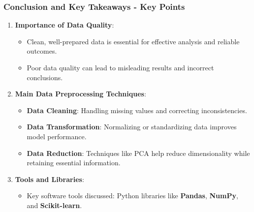 \documentclass{beamer}
\begin{document}
\begin{frame}[fragile]
    \frametitle{Conclusion and Key Takeaways - Key Points}
    \begin{enumerate}
        \item \textbf{Importance of Data Quality}:
            \begin{itemize}
                \item Clean, well-prepared data is essential for effective analysis and reliable outcomes.
                \item Poor data quality can lead to misleading results and incorrect conclusions.
            \end{itemize}
        
        \item \textbf{Main Data Preprocessing Techniques}:
            \begin{itemize}
                \item \textbf{Data Cleaning}: Handling missing values and correcting inconsistencies.
                \item \textbf{Data Transformation}: Normalizing or standardizing data improves model performance.
                \item \textbf{Data Reduction}: Techniques like PCA help reduce dimensionality while retaining essential information.
            \end{itemize}

        \item \textbf{Tools and Libraries}:
            \begin{itemize}
                \item Key software tools discussed: Python libraries like \textbf{Pandas}, \textbf{NumPy}, and \textbf{Scikit-learn}.
            \end{itemize}
    \end{enumerate}
\end{frame}
\end{document}
